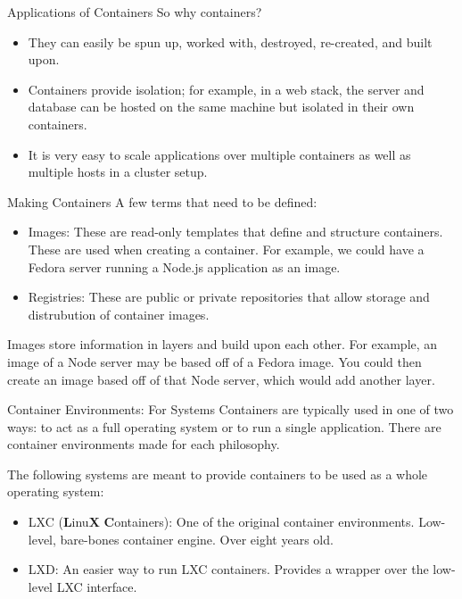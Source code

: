 \documentclass[xcolor=dvipsnames,aspectratio=1610]{beamer}
\begin{document}
  \begin{frame}{Applications of Containers}
    So why containers?

    \begin{itemize}
        \item They can easily be spun up, worked with, destroyed, re-created, and built upon.
        \item Containers provide isolation; for example, in a web stack, the server and database can be hosted on the same machine but isolated in their own containers.
        \item It is very easy to scale applications over multiple containers as well as multiple hosts in a cluster setup.
    \end{itemize}

    \vspace{10px}
  \end{frame}

  \begin{frame}{Making Containers}
      A few terms that need to be defined:
    \begin{itemize}
        \item \alert{Images}: These are read-only templates that define and structure containers. These are used when creating a container. For example, we could have a Fedora server running a Node.js application as an image.
        \item \alert{Registries}: These are public or private repositories that allow storage and distrubution of container images.
    \end{itemize}

    Images store information in layers and build upon each other. For example, an image of a Node server may be based off of a Fedora image. You could then create an image based off of that Node server, which would add another layer.

  \end{frame}

  \begin{frame}{Container Environments: For Systems}
      Containers are typically used in one of two ways: to act as a full operating system or to run a single application. There are container environments made for each philosophy. \newline

      The following systems are meant to provide containers to be used as a whole operating system:
      \begin{itemize}
          \setlength\itemsep{1.6em}
          \item \alert{LXC} (\textbf{L}inu\textbf{X} \textbf{C}ontainers): One of the original container environments. Low-level, bare-bones container engine. Over eight years old.
          \item \alert{LXD}: An easier way to run LXC containers. Provides a wrapper over the low-level LXC interface.
      \end{itemize}
  \end{frame}
\end{document}
